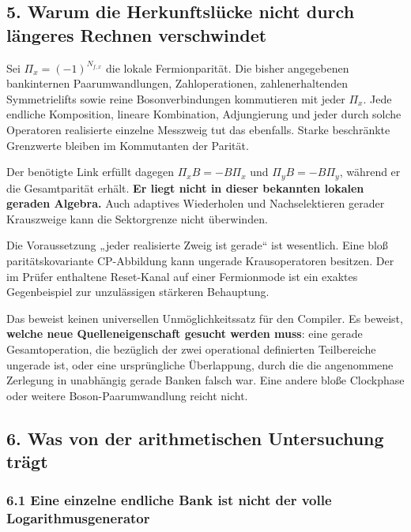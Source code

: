 \subsection{5. Warum die Herkunftslücke nicht durch längeres Rechnen
verschwindet}\label{warum-die-herkunftsluxfccke-nicht-durch-luxe4ngeres-rechnen-verschwindet}

Sei \(\Pi_x=(-1)^{N_{f,x}}\) die lokale Fermionparität. Die bisher
angegebenen bankinternen Paarumwandlungen, Zahloperationen,
zahlenerhaltenden Symmetrielifts sowie reine Bosonverbindungen
kommutieren mit jeder \(\Pi_x\). Jede endliche Komposition, lineare
Kombination, Adjungierung und jeder durch solche Operatoren realisierte
einzelne Messzweig tut das ebenfalls. Starke beschränkte Grenzwerte
bleiben im Kommutanten der Parität.

Der benötigte Link erfüllt dagegen \(\Pi_xB=-B\Pi_x\) und
\(\Pi_yB=-B\Pi_y\), während er die Gesamtparität erhält. \textbf{Er
liegt nicht in dieser bekannten lokalen geraden Algebra.} Auch adaptives
Wiederholen und Nachselektieren gerader Krauszweige kann die
Sektorgrenze nicht überwinden.

Die Voraussetzung „jeder realisierte Zweig ist gerade`` ist wesentlich.
Eine bloß paritätskovariante CP-Abbildung kann ungerade Krausoperatoren
besitzen. Der im Prüfer enthaltene Reset-Kanal auf einer Fermionmode ist
ein exaktes Gegenbeispiel zur unzulässigen stärkeren Behauptung.

Das beweist keinen universellen Unmöglichkeitssatz für den Compiler. Es
beweist, \textbf{welche neue Quelleneigenschaft gesucht werden muss}:
eine gerade Gesamtoperation, die bezüglich der zwei operational
definierten Teilbereiche ungerade ist, oder eine ursprüngliche
Überlappung, durch die die angenommene Zerlegung in unabhängig gerade
Banken falsch war. Eine andere bloße Clockphase oder weitere
Boson-Paarumwandlung reicht nicht.

\subsection{6. Was von der arithmetischen Untersuchung
trägt}\label{was-von-der-arithmetischen-untersuchung-truxe4gt}

\subsubsection{6.1 Eine einzelne endliche Bank ist nicht der volle
Logarithmusgenerator}\label{eine-einzelne-endliche-bank-ist-nicht-der-volle-logarithmusgenerator}

